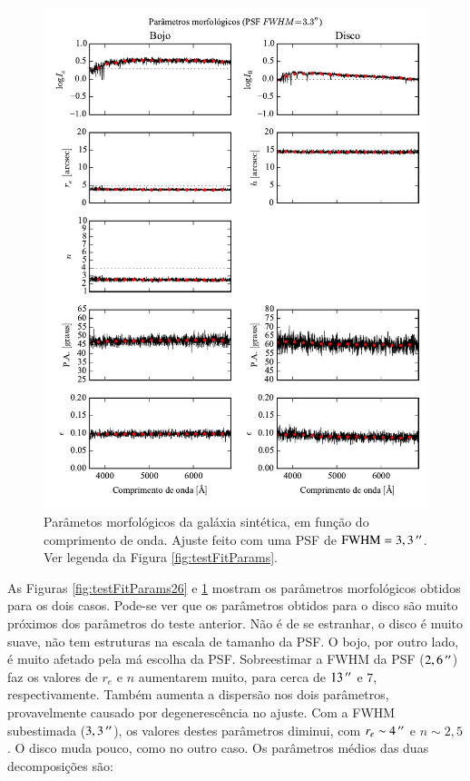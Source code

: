 \begin{figure}
	\includegraphics{figuras/simulation_fitparams_psf33}
	\caption[Parâmetos morfológicos (teste com PSF $\mathrm{FWHM} = 3,3\,\arcs$).]
	{Parâmetos morfológicos da galáxia sintética, em função do comprimento de
	onda. Ajuste feito com uma PSF de $\mathrm{FWHM} = 3,3\,\arcs$. Ver
	legenda da Figura \ref{fig:testFitParams}.}
	\label{fig:testFitParams33}
\end{figure}

As Figuras \ref{fig:testFitParams26} e \ref{fig:testFitParams33} mostram os
parâmetros morfológicos obtidos para os dois casos. Pode-se ver que os
parâmetros obtidos para o disco são muito próximos dos parâmetros do teste
anterior. Não é de se estranhar, o disco é muito suave, não tem estruturas na
escala de tamanho da PSF. O bojo, por outro lado, é muito afetado pela má
escolha da PSF. Sobreestimar a FWHM da PSF ($2,6\,^{\prime\prime}$) faz os valores de
$r_e$ e $n$ aumentarem muito, para cerca de $13\,^{\prime\prime}$ e $7$, respectivamente.
Também aumenta a dispersão nos dois parâmetros, provavelmente causado por
degenerescência no ajuste. Com a FWHM subestimada ($3,3\,^{\prime\prime}$), os valores
destes parâmetros diminui, com $r_e \sim 4\,^{\prime\prime}$ e $n \sim 2,5$. O disco muda
pouco, como no outro caso. Os parâmetros médios das duas decomposições são:

